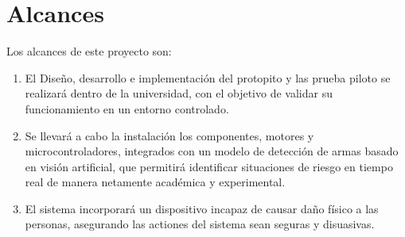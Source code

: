\documentclass{article}
\begin{document}
\section{Alcances}
Los alcances de este proyecto son:

\begin{enumerate}
    \item El Diseño, desarrollo e implementación del protopito y las prueba piloto se realizará dentro de la universidad, con el objetivo de validar su funcionamiento en un entorno controlado.

    \item Se llevará a cabo la instalación los componentes, motores y microcontroladores, integrados con un modelo de detección de armas basado en visión artificial, que permitirá identificar situaciones de riesgo en tiempo real de manera netamente académica y experimental.

    \item El sistema incorporará un dispositivo incapaz de causar daño físico a las personas, asegurando las actiones del sistema sean seguras y disuasivas.
\end{enumerate}
\newpage


\newpage



\end{document}
